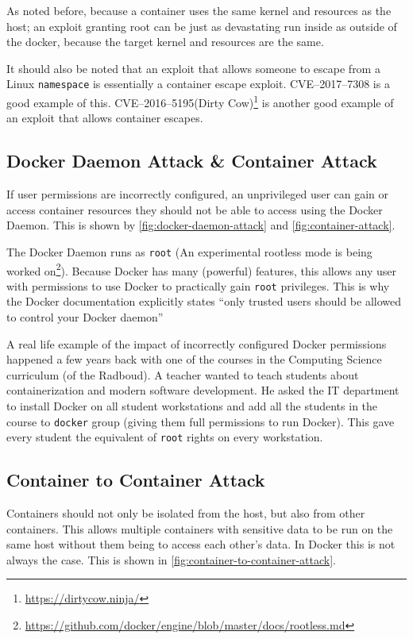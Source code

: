 \hfill

As noted before, because a container uses the same kernel and resources as the host; an exploit granting root can be just as devastating run inside as outside of the docker, because the target kernel and resources are the same.

It should also be noted that an exploit that allows someone to escape from a Linux \lstinline{namespace} is essentially a container escape exploit. CVE--2017--7308\cite{CVE-2017-7308} is a good example of this. CVE--2016--5195(Dirty Cow)\footnote{\url{https://dirtycow.ninja/}} is another good example of an exploit that allows container escapes\cite{Dirty-Cow-Escape}.

\subsection{Docker Daemon Attack \& Container Attack}
If user permissions are incorrectly configured, an unprivileged user can gain or access container resources they should not be able to access using the Docker Daemon. This is shown by \autoref{fig:docker-daemon-attack} and \autoref{fig:container-attack}.

\hfill

The Docker Daemon runs as \lstinline{root} (An experimental rootless mode is being worked on\footnote{\url{https://github.com/docker/engine/blob/master/docs/rootless.md}}). Because Docker has many (powerful) features, this allows any user with permissions to use Docker to practically gain \lstinline{root} privileges. This is why the Docker documentation explicitly states ``only trusted users should be allowed to control your Docker daemon''\cite{Docker-Daemon-Attack-Surface}

\hfill

A real life example of the impact of incorrectly configured Docker permissions happened a few years back with one of the courses in the Computing Science curriculum (of the Radboud). A teacher wanted to teach students about containerization and modern software development. He asked the IT department to install Docker on all student workstations and add all the students in the course to \lstinline{docker} group (giving them full permissions to run Docker). This gave every student the equivalent of \lstinline{root} rights on every workstation.

\subsection{Container to Container Attack}
Containers should not only be isolated from the host, but also from other containers. This allows multiple containers with sensitive data to be run on the same host without them being to access each other's data. In Docker this is not always the case. This is shown in \autoref{fig:container-to-container-attack}.


